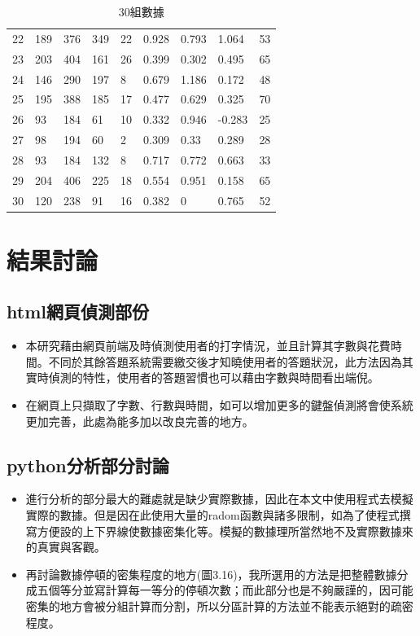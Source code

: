 \begin{table}[]
\begin{tabular}{lllllllll}
		22 & 189 & 376 & 349    & 22     & 0.928  & 0.793  & 1.064  & 53      \\
		23 & 203 & 404 & 161    & 26     & 0.399  & 0.302  & 0.495  & 65      \\
		24 & 146 & 290 & 197    & 8      & 0.679  & 1.186  & 0.172  & 48      \\
		25 & 195 & 388 & 185    & 17     & 0.477  & 0.629  & 0.325  & 70      \\
		26 & 93  & 184 & 61     & 10     & 0.332  & 0.946  & -0.283 & 25      \\
		27 & 98  & 194 & 60     & 2      & 0.309  & 0.33   & 0.289  & 28      \\
		28 & 93  & 184 & 132    & 8      & 0.717  & 0.772  & 0.663  & 33      \\
		29 & 204 & 406 & 225    & 18     & 0.554  & 0.951  & 0.158  & 65      \\
		30 & 120 & 238 & 91     & 16     & 0.382  & 0      & 0.765  & 52     
	\end{tabular}
\caption{30組數據}
\end{table}
\newpage
\section{結果討論}
\subsection{html網頁偵測部份}
\begin{itemize}
	\item 本研究藉由網頁前端及時偵測使用者的打字情況，並且計算其字數與花費時間。不同於其餘答題系統需要繳交後才知曉使用者的答題狀況，此方法因為其實時偵測的特性，使用者的答題習慣也可以藉由字數與時間看出端倪。
	\item 在網頁上只擷取了字數、行數與時間，如可以增加更多的鍵盤偵測將會使系統更加完善，此處為能多加以改良完善的地方。
\end{itemize}
\subsection{python分析部分討論}
\begin{itemize}
	\item 進行分析的部分最大的難處就是缺少實際數據，因此在本文中使用程式去模擬實際的數據。但是因在此使用大量的radom函數與諸多限制，如為了使程式撰寫方便設的上下界線使數據密集化等。模擬的數據理所當然地不及實際數據來的真實與客觀。
	\item 再討論數據停頓的密集程度的地方(圖3.16)，我所選用的方法是把整體數據分成五個等分並寫計算每一等分的停頓次數；而此部分也是不夠嚴謹的，因可能密集的地方會被分組計算而分割，所以分區計算的方法並不能表示絕對的疏密程度。
\end{itemize}